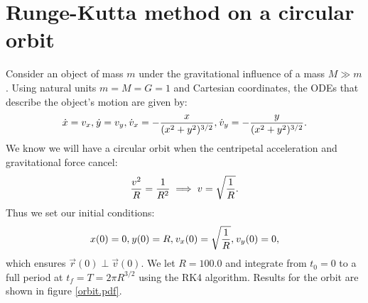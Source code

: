 \documentclass{article}
\begin{document}
\section{Runge-Kutta method on a circular orbit}

Consider an object of mass $m$ under the gravitational influence of a
mass $M \gg m$. Using natural units $m = M = G = 1$ and Cartesian coordinates,
the ODEs that describe the object's motion are given by:
\begin{align}
    \dot x = v_x,
    \sp{}
    \dot y = v_y,
    \sp{}
    \dot v_x = -{x \over (x^2 + y^2)^{3/2}},
    \sp{}
    \dot v_y = -{y \over (x^2 + y^2)^{3/2}}.
\end{align}
We know we will have a circular orbit when the centripetal acceleration
and gravitational force cancel:
\begin{align}
    {v^2 \over R} = {1 \over R^2} \implies v = \sqrt{1 \over R}.
\end{align}
Thus we set our initial conditions:
\begin{align}
    x(0) = 0,
    \sp{}
    y(0) = R,
    \sp{}
    v_x(0) = \sqrt{1 \over R},
    \sp{}
    v_y(0) = 0,
\end{align}
which ensures $\vec r(0) \perp \vec v(0)$. We let $R = 100.0$ and integrate
from $t_0 = 0$ to a full period at $t_f = T = 2\pi R^{3/2}$ using the RK4
algorithm. Results for the orbit are shown in figure \ref{orbit.pdf}.

\end{document}
